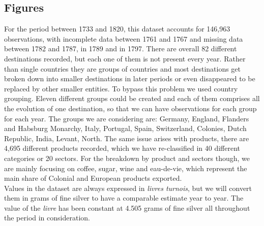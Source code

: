 \documentclass[12pt,a4paper,notitlepage,english]{article}
\begin{document}
\subsection{Figures}
For the period between 1733 and 1820, this dataset accounts for 146,963 observations, with incomplete data between 1761 and 1767 and missing data between 1782 and 1787, in 1789 and in 1797. There are overall 82 different destinations recorded, but each one of them is not present every year. Rather than single countries they are groups of countries and most destinations get broken down into smaller destinations in later periods or even disappeared to be replaced by other smaller entities. To bypass this problem we used country grouping. Eleven different groups could be created and each of them comprises all the evolution of one destination, so that we can have observations for each group for each year. The groups we are considering are: Germany, England, Flanders and Habsburg Monarchy, Italy, Portugal, Spain, Switzerland, Colonies, Dutch Republic, India, Levant, North. The same issue arises with products, there are 4,695 different products recorded, which we have re-classified in 40 different categories or 20 sectors. For the breakdown by product and sectors though, we are mainly focusing on coffee, sugar, wine and eau-de-vie, which represent the main share of Colonial and European products exported. \\
Values in the dataset are always expressed in \textit{livres turnois}, but we will convert them in grams of fine silver to have a comparable estimate year to year. The value of the \textit{livre} has been constant at 4.505 grams of fine silver all throughout the period in consideration.
\end{document}
